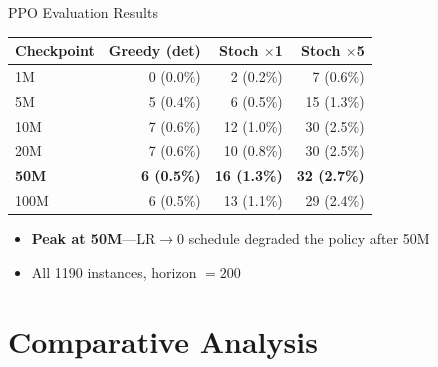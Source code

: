 \documentclass[aspectratio=169,11pt]{beamer}
\begin{document}
\begin{frame}{PPO Evaluation Results}
  \begin{center}
  \begin{tabular}{l@{\hskip 12pt}r@{\hskip 12pt}r@{\hskip 12pt}r}
    \toprule
    \textbf{Checkpoint} & \textbf{Greedy (det)} & \textbf{Stoch $\times$1} & \textbf{Stoch $\times$5} \\
    \midrule
    1M   & 0 (0.0\%)  & 2 (0.2\%)   & 7 (0.6\%)   \\
    5M   & 5 (0.4\%)  & 6 (0.5\%)   & 15 (1.3\%)  \\
    10M  & 7 (0.6\%)  & 12 (1.0\%)  & 30 (2.5\%)  \\
    20M  & 7 (0.6\%)  & 10 (0.8\%)  & 30 (2.5\%)  \\
    \rowcolor{highlight}
    \textbf{50M}  & \textbf{6 (0.5\%)}  & \textbf{16 (1.3\%)}  & \textbf{32 (2.7\%)} \\
    100M & 6 (0.5\%)  & 13 (1.1\%)  & 29 (2.4\%)  \\
    \bottomrule
  \end{tabular}
  \end{center}

  \bigskip
  \begin{itemize}
    \item \textbf{Peak at 50M}---LR$\to$0 schedule \textcolor{bad}{degraded} the policy after 50M
    \item All 1190 instances, horizon $= 200$
  \end{itemize}
\end{frame}

\section{Comparative Analysis}
\end{document}
